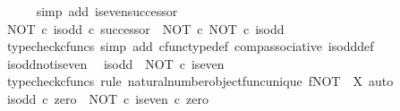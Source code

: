 \begin{isabellebody}
\ \ \ \ \isamarkupfalse%
\ {\isacharparenleft}{\kern0pt}simp\ add{\isacharcolon}{\kern0pt}\ is{\isacharunderscore}{\kern0pt}even{\isacharunderscore}{\kern0pt}successor{\isacharparenright}{\kern0pt}\isanewline
\isanewline
\ \ \isamarkupfalse%
\ {\isachardoublequoteopen}{\isacharparenleft}{\kern0pt}NOT\ {\isasymcirc}\isactrlsub c\ is{\isacharunderscore}{\kern0pt}odd{\isacharparenright}{\kern0pt}\ {\isasymcirc}\isactrlsub c\ successor\ {\isacharequal}{\kern0pt}\ NOT\ {\isasymcirc}\isactrlsub c\ NOT\ {\isasymcirc}\isactrlsub c\ is{\isacharunderscore}{\kern0pt}odd{\isachardoublequoteclose}\isanewline
\ \ \ \ \isamarkupfalse%
\ {\isacharparenleft}{\kern0pt}typecheck{\isacharunderscore}{\kern0pt}cfuncs{\isacharcomma}{\kern0pt}\ simp\ add{\isacharcolon}{\kern0pt}\ cfunc{\isacharunderscore}{\kern0pt}type{\isacharunderscore}{\kern0pt}def\ comp{\isacharunderscore}{\kern0pt}associative\ is{\isacharunderscore}{\kern0pt}odd{\isacharunderscore}{\kern0pt}def{}{\isacharparenright}{\kern0pt}\isanewline
{}\isamarkupfalse%
%
\endisatagproof
{\isafoldproof}%
%
\isadelimproof
\isanewline
%
\endisadelimproof
\isanewline
{}\isamarkupfalse%
\ is{\isacharunderscore}{\kern0pt}odd{\isacharunderscore}{\kern0pt}not{\isacharunderscore}{\kern0pt}is{\isacharunderscore}{\kern0pt}even{\isacharcolon}{\kern0pt}\isanewline
\ \ {\isachardoublequoteopen}is{\isacharunderscore}{\kern0pt}odd\ {\isacharequal}{\kern0pt}\ NOT\ {\isasymcirc}\isactrlsub c\ is{\isacharunderscore}{\kern0pt}even{\isachardoublequoteclose}\isanewline
%
\isadelimproof
%
\endisadelimproof
%
\isatagproof
{}\isamarkupfalse%
\ {\isacharparenleft}{\kern0pt}typecheck{\isacharunderscore}{\kern0pt}cfuncs{\isacharcomma}{\kern0pt}\ rule\ natural{\isacharunderscore}{\kern0pt}number{\isacharunderscore}{\kern0pt}object{\isacharunderscore}{\kern0pt}func{\isacharunderscore}{\kern0pt}unique{\isacharbrackleft}{\kern0pt}\ f{\isacharequal}{\kern0pt}{\isachardoublequoteopen}NOT{\isachardoublequoteclose}{\isacharcomma}{\kern0pt}\ \ X{\isacharequal}{\kern0pt}{\isachardoublequoteopen}{\isasymOmega}{\isachardoublequoteclose}{\isacharbrackright}{\kern0pt}{\isacharcomma}{\kern0pt}\ auto{\isacharparenright}{\kern0pt}\isanewline
\ \ \isamarkupfalse%
\ {\isachardoublequoteopen}is{\isacharunderscore}{\kern0pt}odd\ {\isasymcirc}\isactrlsub c\ zero\ {\isacharequal}{\kern0pt}\ {\isacharparenleft}{\kern0pt}NOT\ {\isasymcirc}\isactrlsub c\ is{\isacharunderscore}{\kern0pt}even{\isacharparenright}{\kern0pt}\ {\isasymcirc}\isactrlsub c\ zero{\isachardoublequoteclose}\isanewline

\end{isabellebody}
